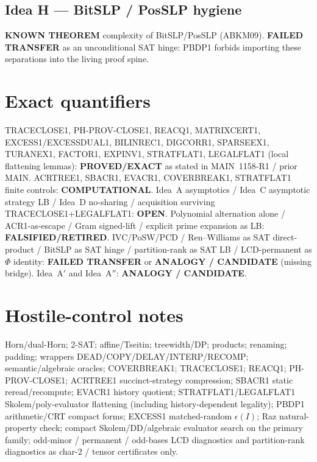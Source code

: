 \documentclass[11pt]{article}
\begin{document}
\subsection*{Idea H --- BitSLP / PosSLP hygiene}
\textbf{KNOWN THEOREM} complexity of BitSLP/PosSLP (ABKM09). \textbf{FAILED TRANSFER}
as an unconditional SAT hinge: PBDP1 forbids importing these separations into the living proof spine.

\section*{Exact quantifiers}
TRACECLOSE1, PH-PROV-CLOSE1, REACQ1, MATRIXCERT1, EXCESS1/EXCESSDUAL1, BILINREC1, DIGCORR1,
SPARSEEX1, TURANEX1, FACTOR1, EXPINV1, STRATFLAT1, LEGALFLAT1 (local flattening lemmas):
\textbf{PROVED/EXACT} as stated in MAIN~1158-R1 / prior MAIN.
ACRTREE1, SBACR1, EVACR1, COVERBREAK1, STRATFLAT1 finite controls: \textbf{COMPUTATIONAL}.
Idea~A asymptotics / Idea~C asymptotic strategy LB / Idea~D no-sharing / acquisition surviving
TRACECLOSE1+LEGALFLAT1: \textbf{OPEN}.
Polynomial alternation alone / ACR1-as-escape / Gram signed-lift / explicit prime expansion as LB:
\textbf{FALSIFIED/RETIRED}.
IVC/PoSW/PCD / Ren--Williams as SAT direct-product / BitSLP as SAT hinge / partition-rank as
SAT LB / LCD-permanent as $\Phi$ identity: \textbf{FAILED TRANSFER} or \textbf{ANALOGY / CANDIDATE}
(missing bridge).
Idea~A$'$ and Idea~A$''$: \textbf{ANALOGY / CANDIDATE}.

\section*{Hostile-control notes}
Horn/dual-Horn; 2-SAT; affine/Tseitin; treewidth/DP; products; renaming; padding;
wrappers DEAD/COPY/DELAY/INTERP/RECOMP; semantic/algebraic oracles; COVERBREAK1;
TRACECLOSE1; REACQ1; PH-PROV-CLOSE1; ACRTREE1 succinct-strategy compression; SBACR1
static reread/recompute; EVACR1 history quotient; STRATFLAT1/LEGALFLAT1 Skolem/poly-evaluator
flattening (including history-dependent legality); PBDP1 arithmetic/CRT compact forms;
EXCESS1 matched-random $\epsilon(I)$; Raz natural-property check; compact Skolem/DD/algebraic
evaluator search on the primary family; odd-minor / permanent / odd-bases LCD diagnostics
and partition-rank diagnostics as char-$2$ / tensor certificates only.
\end{document}
